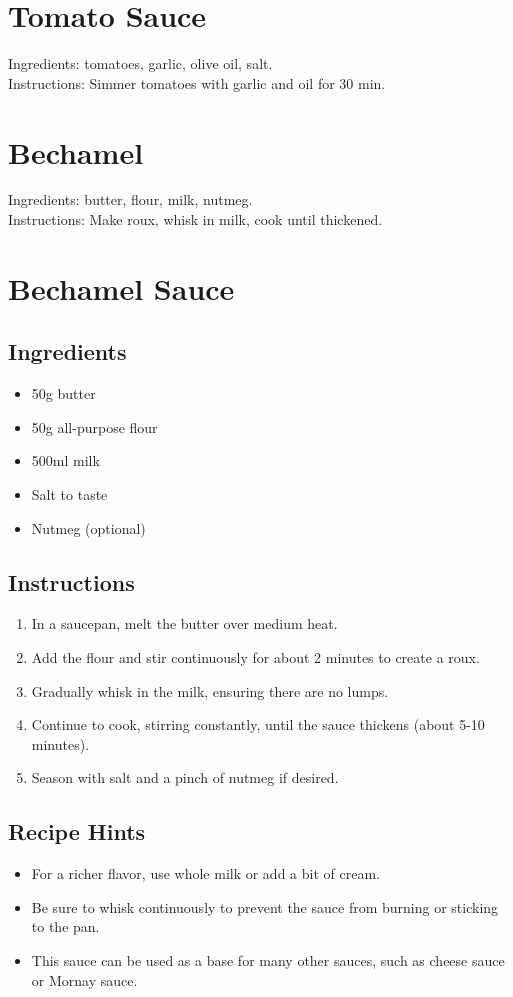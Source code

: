 

\section{Tomato Sauce}
Ingredients: tomatoes, garlic, olive oil, salt. \\
Instructions: Simmer tomatoes with garlic and oil for 30 min.

\section{Bechamel}
Ingredients: butter, flour, milk, nutmeg. \\
Instructions: Make roux, whisk in milk, cook until thickened.

\section{Bechamel Sauce}
\subsection*{Ingredients}
\begin{itemize}
    \item 50g butter
    \item 50g all-purpose flour
    \item 500ml milk
    \item Salt to taste
    \item Nutmeg (optional)
\end{itemize}

\subsection*{Instructions}
\begin{enumerate}
    \item In a saucepan, melt the butter over medium heat.
    \item Add the flour and stir continuously for about 2 minutes to create a roux.
    \item Gradually whisk in the milk, ensuring there are no lumps.
    \item Continue to cook, stirring constantly, until the sauce thickens (about 5-10 minutes).
    \item Season with salt and a pinch of nutmeg if desired.
\end{enumerate}

\subsection*{Recipe Hints}
\begin{itemize}
    \item For a richer flavor, use whole milk or add a bit of cream.
    \item Be sure to whisk continuously to prevent the sauce from burning or sticking to the pan.
    \item This sauce can be used as a base for many other sauces, such as cheese sauce or Mornay sauce.
\end{itemize}